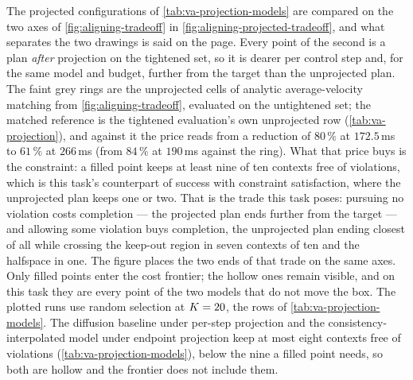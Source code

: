 The projected configurations of \autoref{tab:va-projection-models} are compared on the two axes of
\autoref{fig:aligning-tradeoff} in \autoref{fig:aligning-projected-tradeoff}, and what separates the two
drawings is said on the page. Every point of the second is a plan \emph{after} projection on the tightened
set, so it is dearer per control step and, for the same model and budget, further from the target than
the unprojected plan. The faint grey rings are the unprojected cells of analytic average-velocity matching
from \autoref{fig:aligning-tradeoff}, evaluated on the untightened set; the matched reference is the
tightened evaluation's own unprojected row (\autoref{tab:va-projection}), and against it the price reads
from a reduction of $80\,\%$ at $172.5$\,ms to $61\,\%$ at $266$\,ms (from $84\,\%$ at $190$\,ms against the
ring). What that price buys is the constraint: a filled point keeps at least nine of ten
contexts free of violations, which is this task's counterpart of success with constraint satisfaction,
where the unprojected plan keeps one or two. That is the trade this task poses: pursuing no violation
costs completion --- the projected plan ends further from the target --- and allowing some violation
buys completion, the unprojected plan ending closest of all while crossing the keep-out region in seven
contexts of ten and the halfspace in one. The figure places the two ends of that trade on the same axes. Only filled points enter the cost frontier; the hollow ones
remain visible, and on this task they are every point of the two models that do not move the box. The
plotted runs use random selection at $K=20$, the rows of \autoref{tab:va-projection-models}. The
diffusion baseline under per-step projection and the consistency-interpolated model under endpoint
projection keep at most eight contexts free of violations (\autoref{tab:va-projection-models}), below the
nine a filled point needs, so both are hollow and the frontier does not include them.

